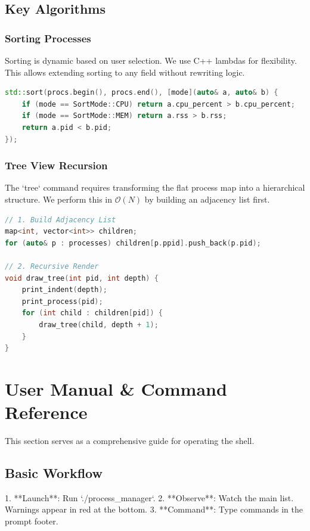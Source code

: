 \documentclass[a4paper,12pt]{article}
\begin{document}
\subsection{Key Algorithms}

\subsubsection{Sorting Processes}
Sorting is dynamic based on user selection. We use C++ lambdas for flexibility. This allows extending sorting to any field without rewriting logic.

\begin{lstlisting}[language=C++]
std::sort(procs.begin(), procs.end(), [mode](auto& a, auto& b) {
    if (mode == SortMode::CPU) return a.cpu_percent > b.cpu_percent;
    if (mode == SortMode::MEM) return a.rss > b.rss;
    return a.pid < b.pid;
});
\end{lstlisting}

\subsubsection{Tree View Recursion}
The `tree` command requires transforming the flat process map into a hierarchical structure. We perform this in $\mathcal{O}(N)$ by building an adjacency list first.

\begin{lstlisting}[language=C++]
// 1. Build Adjacency List
map<int, vector<int>> children;
for (auto& p : processes) children[p.ppid].push_back(p.pid);

// 2. Recursive Render
void draw_tree(int pid, int depth) {
    print_indent(depth);
    print_process(pid);
    for (int child : children[pid]) {
        draw_tree(child, depth + 1);
    }
}
\end{lstlisting}

\newpage

\section{User Manual \& Command Reference}

This section serves as a comprehensive guide for operating the shell.

\subsection{Basic Workflow}
1.  **Launch**: Run `./process_manager`.
2.  **Observe**: Watch the main list. Warnings appear in red at the bottom.
3.  **Command**: Type commands in the prompt footer.
\end{document}
